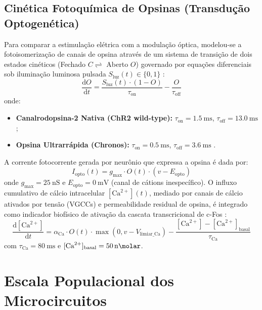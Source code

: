 \documentclass[12pt,openright,oneside,a4paper,brazil]{abntex2}
\begin{document}
\subsection{Cinética Fotoquímica de Opsinas (Transdução Optogenética)}
Para comparar a estimulação elétrica com a modulação óptica, modelou-se a fotoisomerização de canais de opsina através de um sistema de transição de dois estados cinéticos (Fechado $C \rightleftharpoons$ Aberto $O$) governado por equações diferenciais sob iluminação luminosa pulsada $S_{\text{luz}}(t) \in \{0, 1\}$ \cite{nikolic2009, grossman2011}:
\begin{equation}
    \frac{\mathrm{d}O}{\mathrm{d}t} = \frac{S_{\text{luz}}(t) \cdot (1 - O)}{\tau_{\text{on}}} - \frac{O}{\tau_{\text{off}}} \label{eq:opsina}
\end{equation}
onde:
\begin{itemize}
    \item \textbf{Canalrodopsina-2 Nativa (ChR2 wild-type):} $\tau_{\text{on}} = \qty{1.5}{\milli\second}$, $\tau_{\text{off}} = \qty{13.0}{\milli\second}$ \cite{grossman2011};
    \item \textbf{Opsina Ultrarrápida (Chronos):} $\tau_{\text{on}} = \qty{0.5}{\milli\second}$, $\tau_{\text{off}} = \qty{3.6}{\milli\second}$ \cite{klapoetke2014}.
\end{itemize}
A corrente fotocorrente gerada por neurônio que expressa a opsina é dada por:
\begin{equation}
    I_{\text{opto}}(t) = g_{\text{max}} \cdot O(t) \cdot (v - E_{\text{opto}})
\end{equation}
onde $g_{\text{max}} = \qty{25}{\nano\siemens}$ e $E_{\text{opto}} = \qty{0}{\milli\volt}$ (canal de cátions inespecífico). O influxo cumulativo de cálcio intracelular $[\text{Ca}^{2+}](t)$, mediado por canais de cálcio ativados por tensão (VGCCs) e permeabilidade residual de opsina, é integrado como indicador biofísico de ativação da cascata transcricional de c-Fos \cite{kandel2021}:
\begin{equation}
    \frac{\mathrm{d}[\text{Ca}^{2+}]}{\mathrm{d}t} = \alpha_{\text{Ca}} \cdot O(t) \cdot \max(0, v - V_{\text{limiar\_Ca}}) - \frac{[\text{Ca}^{2+}] - [\text{Ca}^{2+}]_{\text{basal}}}{\tau_{\text{Ca}}} \label{eq:calcio}
\end{equation}
com $\tau_{\text{Ca}} = \qty{80}{\milli\second}$ e $[\text{Ca}^{2+}]_{\text{basal}} = \qty{50}{\nano\molar}$.

\section{Escala Populacional dos Microcircuitos}
\end{document}
